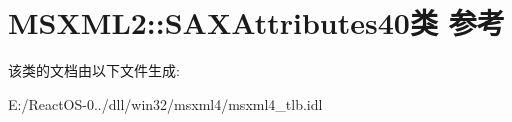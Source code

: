 \hypertarget{class_m_s_x_m_l2_1_1_s_a_x_attributes40}{}\section{M\+S\+X\+M\+L2\+:\+:S\+A\+X\+Attributes40类 参考}
\label{class_m_s_x_m_l2_1_1_s_a_x_attributes40}


该类的文档由以下文件生成\+:\begin{DoxyCompactItemize}
\item 
E\+:/\+React\+O\+S-\/0../dll/win32/msxml4/msxml4\+\_\+tlb.\+idl\end{DoxyCompactItemize}
